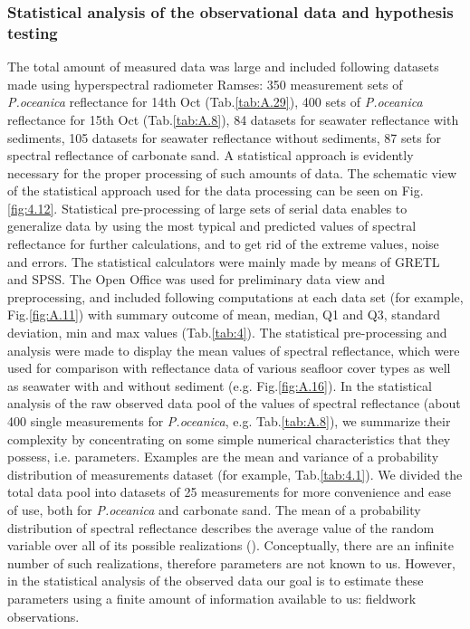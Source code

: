 \documentclass[11pt]{article}
\begin{document}
\subsubsection{Statistical analysis of the observational data and hypothesis testing}
The total amount of measured data was large and included following datasets made using
hyperspectral radiometer Ramses: 350 measurement sets of \textit{P.oceanica} reflectance for 14th Oct (Tab.\ref{tab:A.29}), 400
sets of \textit{P.oceanica} reflectance for 15th Oct (Tab.\ref{tab:A.8}), 84 datasets for seawater reflectance with sediments, 105
datasets for seawater reflectance without sediments, 87 sets for spectral reflectance of carbonate sand.
A statistical approach is evidently necessary for the proper processing of such amounts of data. 
The schematic view of the statistical approach used for the data processing  can be seen on Fig. \ref{fig:4.12}.
Statistical pre-processing of large sets of serial data enables to generalize data by using the most typical and predicted values of
spectral reflectance for further calculations, and to get rid of the extreme values, noise and errors.
The statistical calculators were mainly made by means of \ac{GRETL} and SPSS. 
The Open Office was used for preliminary data view and preprocessing, and included following computations
at each data set (for example, Fig.\ref{fig:A.11}) with summary outcome of mean, median, Q1 and Q3, standard deviation, min and max values (Tab.\ref{tab:4}). 
The statistical pre-processing\label{page-40} and analysis were made to display the mean values of spectral reflectance,
which were used for comparison with reflectance data of various seafloor cover types as well as
seawater with and without sediment (e.g. Fig.\ref{fig:A.16}).
In the statistical analysis of the raw observed data pool of the values of spectral reflectance (about 400 single measurements for \textit{P.oceanica}, e.g. Tab.\ref{tab:A.8}), we summarize their complexity by concentrating on some simple numerical characteristics that they possess, i.e. parameters. Examples are the mean and variance of a probability distribution of measurements dataset (for example, Tab.\ref{tab:4.1}). We divided the total data pool into datasets of 25 measurements for more convenience and ease of use, both for \textit{P.oceanica} and carbonate sand. The mean of a probability distribution of spectral reflectance describes the average value of the random variable over all of its possible realizations (). Conceptually, there are an infinite number of such realizations, therefore parameters are not known to us. However, in the statistical analysis of the observed data our goal is to estimate these parameters using a finite amount of information available to us: fieldwork observations.
\end{document}
